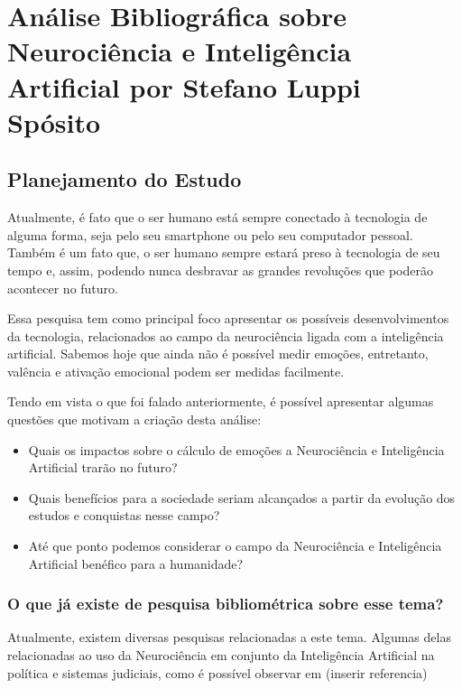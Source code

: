 \chapter{Análise Bibliográfica sobre Neurociência e Inteligência Artificial por Stefano Luppi Spósito\label{chap:bibliometria:kawaiistheno}}

\section{Planejamento do Estudo}

Atualmente, é fato que o ser humano está sempre conectado à tecnologia de alguma forma, seja pelo seu smartphone ou pelo seu computador pessoal. Também é um fato que, o ser humano sempre estará preso à tecnologia de seu tempo e, assim, podendo nunca desbravar as grandes revoluções que poderão acontecer no futuro.

Essa pesquisa tem como principal foco apresentar os possíveis desenvolvimentos da tecnologia, relacionados ao campo da neurociência ligada com a inteligência artificial. Sabemos hoje que ainda não é possível medir emoções, entretanto, valência e ativação emocional podem ser medidas facilmente.

Tendo em vista o que foi falado anteriormente, é possível apresentar algumas questões que motivam a criação desta análise:

\begin{itemize}
    \item Quais os impactos sobre o cálculo de emoções a Neurociência e Inteligência Artificial trarão no futuro?
    \item Quais benefícios para a sociedade seriam alcançados a partir da evolução dos estudos e conquistas nesse campo?
    \item Até que ponto podemos considerar o campo da Neurociência e Inteligência Artificial benéfico para a humanidade?
\end{itemize}

\subsection{O que já existe de pesquisa bibliométrica sobre esse tema?}

Atualmente, existem diversas pesquisas relacionadas a este tema. Algumas delas relacionadas ao uso da Neurociência em conjunto da Inteligência Artificial na política e sistemas judiciais, como é possível observar em (inserir referencia)


